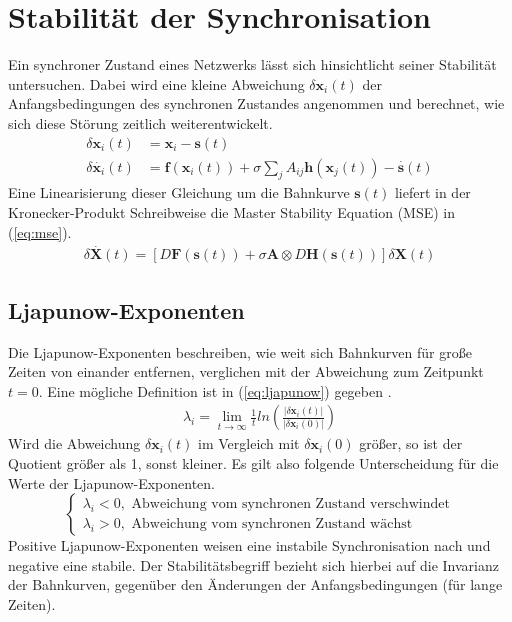 \section{Stabilität der Synchronisation}
Ein synchroner Zustand eines Netzwerks lässt sich hinsichtlicht seiner Stabilität untersuchen. Dabei wird eine kleine Abweichung $\delta\boldsymbol{x}_i(t)$ der Anfangsbedingungen des synchronen Zustandes angenommen und berechnet, wie sich diese Störung zeitlich weiterentwickelt.
\begin{align}\label{eq:deltaxi}
\delta \boldsymbol{x}_i(t) &= \boldsymbol{x}_i - \boldsymbol{s}(t)\\
\delta \overset{\cdot}{\boldsymbol{x}}_i(t) &= \boldsymbol{f}(\boldsymbol{x}_i(t))+\sigma\sum_j A_{ij}\boldsymbol{h}\left(\boldsymbol{x}_j(t)\right) - \overset{\cdot}{\boldsymbol{s}}(t)
\end{align}
Eine Linearisierung dieser Gleichung um die Bahnkurve $\boldsymbol{s}(t)$ liefert in der Kronecker-Produkt Schreibweise die Master Stability Equation (MSE) in (\ref{eq:mse}).
\begin{align}\label{eq:mse}
\delta\overset{\cdot}{\boldsymbol{X}}(t)=
\left[D\boldsymbol{F}(\boldsymbol{s}(t))+\sigma\boldsymbol{A}\otimes D\boldsymbol{H}(\boldsymbol{s}(t))\right]\delta\boldsymbol{X}(t)
\end{align}

\subsection*{Ljapunow-Exponenten}
Die Ljapunow-Exponenten beschreiben, wie weit sich Bahnkurven für große Zeiten von einander entfernen, verglichen mit der Abweichung zum Zeitpunkt $t=0$. Eine mögliche Definition ist in  (\ref{eq:ljapunow}) gegeben \cite{lyapunow}.
\begin{align}\label{eq:ljapunow}
\lambda_i=\lim_{t\rightarrow\infty}\frac{1}{t} ln\left(\frac{|\delta \boldsymbol{x}_i(t)|}{|\delta \boldsymbol{x}_i(0)|}\right)
\end{align}
Wird die Abweichung $\delta\boldsymbol{x}_i(t)$ im Vergleich mit $\delta\boldsymbol{x}_i(0)$ größer, so ist der Quotient größer als 1, sonst kleiner. Es gilt also folgende Unterscheidung für die Werte der Ljapunow-Exponenten.
\begin{equation}
\begin{cases}
\lambda_i < 0, \text{ Abweichung vom synchronen Zustand verschwindet}\\
\lambda_i > 0, \text{ Abweichung vom synchronen Zustand wächst}
\end{cases}
\end{equation}
Positive Ljapunow-Exponenten weisen eine instabile Synchronisation nach und negative eine stabile. Der Stabilitätsbegriff bezieht sich hierbei auf die Invarianz der Bahnkurven, gegenüber den Änderungen der Anfangsbedingungen (für lange Zeiten). 
